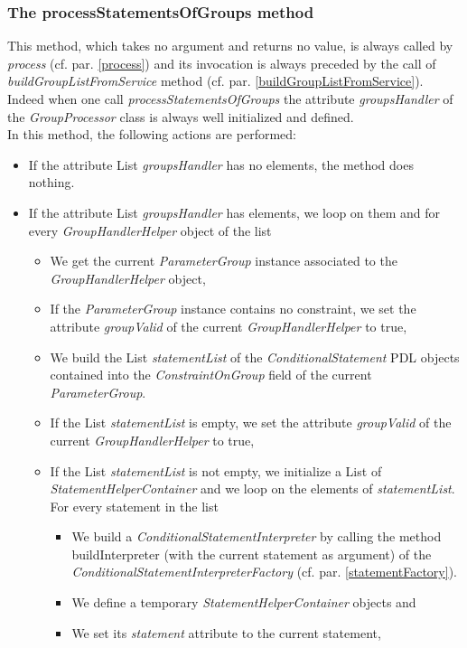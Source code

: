 \documentclass[a4paper,11pt] {ivoa}
\begin{document}
\subsubsection{The processStatementsOfGroups method}\label{processStatementsOfGroups}
This method, which takes no argument and returns no value, is always called by  {\it process}  (cf. par. \ref{process}) and its invocation is always preceded by the call of {\it buildGroupListFromService}  method (cf. par. \ref{buildGroupListFromService}). Indeed when one call {\it processStatementsOfGroups} 
the attribute {\it groupsHandler} of the {\it GroupProcessor} class is always well initialized and defined.\\
In this method, the following actions are performed:
\begin{itemize}
\item If the attribute List {\it groupsHandler} has no elements, the method does nothing.
\item If the attribute List {\it groupsHandler} has elements, we loop on them and for every {\it GroupHandlerHelper} object of the list
\begin{itemize}
\item We get the current {\it ParameterGroup} instance associated to the {\it GroupHandlerHelper} object,
\item If the {\it ParameterGroup} instance contains no constraint, we set the attribute {\it groupValid} of the current  {\it GroupHandlerHelper} to true,
\item We build the List {\it statementList} of the {\it ConditionalStatement} PDL objects contained into the {\it ConstraintOnGroup} field of the current {\it ParameterGroup}.
\item If the List {\it statementList}  is empty, we set the attribute {\it groupValid} of the current  {\it GroupHandlerHelper} to true,
\item If the List {\it statementList}  is not empty, we initialize a List of {\it StatementHelperContainer} and we loop on the elements of {\it statementList}. For every statement in the list
\begin{itemize}
\item We build a {\it ConditionalStatementInterpreter} by calling the method buildInterpreter (with the current statement as argument) of the {\it ConditionalStatementInterpreterFactory} (cf. par. \ref{statementFactory}).
\item We define a temporary {\it StatementHelperContainer} objects and
\item We set its {\it statement} attribute to the current statement, 

\end{itemize}
\end{itemize}
\end{itemize}
\end{document}
